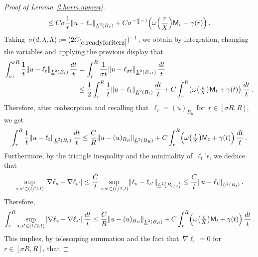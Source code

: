 \documentclass[11pt,twoside]{article} %
\numberwithin{equation}{section}
\theoremstyle{definition}
\let\originalleft\left
\let\originalright\right
\renewcommand{\left}{\mathopen{}\mathclose\bgroup\originalleft}
\renewcommand{\right}{\aftergroup\egroup\originalright}
\begin{document}
\begin{proof}[{Proof of Lemma~\ref{l.harm.approx}}]
\begin{equation}
\leq
C\sigma \frac 1r \left\| u- \ell_r \right\|_{\underline{L}^2 \left( B_{r} \right)} 
+
C\sigma^{-\frac d2 - 1} \left( \omega\Bigl( \frac{r}X \Bigr)  \mathsf{M}_r  + \gamma(r)\right)
\,.
\end{equation}
Taking~$\sigma(d,\lambda,\Lambda): = (2C_{\eqref{e.readyforiterz}})^{-1}$, we obtain by integration, changing the variables and applying the previous display that
\begin{align*} %
\int_{\sigma r}^{\sigma R} 
\frac1{t} \left\| u - \ell_{t} \right\|_{\underline{L}^2 \left( B_{ t} \right)} \, \frac{dt}{t}
& 
=
\int_{r}^{R} 
\frac1{\sigma t} \left\| u - \ell_{\sigma t} \right\|_{\underline{L}^2 \left( B_{\sigma t} \right)} \, \frac{dt}{t}
\notag \\ &
\leq 
\frac12
\int_{r}^{R} 
\frac1{t} \left\| u - \ell_{t} \right\|_{\underline{L}^2 \left( B_{ t} \right)} \, \frac{dt}{t}
+
C
\int_{r}^{R} 
\left(  \omega \bigl( \tfrac{t}X \bigr)  \mathsf{M}_t + \gamma(t)\right) \, \frac{dt}{t}\,.
\end{align*}
Therefore, after reabsorption and recalling that~$\ell_r = (u)_{B_R}$ for~$r \in [\sigma R,R]$, we get 
\begin{equation*}  
\int_{r}^{R} 
\frac1{t} \left\| u - \ell_{t} \right\|_{\underline{L}^2 \left( B_{ t} \right)} \, \frac{dt}{t}
\leq 
\frac CR \left\| u- (u)_{B_R} \right\|_{\underline{L}^2 \left( B_{R} \right)}   
+ C \int_{ r}^{R}  \Bigl( \omega\bigl( \tfrac{t}X \bigr)  \mathsf{M}_t  + \gamma(t) \Bigr) \, \frac{dt}{t} 
\,.
\end{equation*}
Furthermore, by the triangle inequality and the minimality of~$\ell_t$'s,  we deduce that 
\begin{equation*} %
\sup_{s,s' \in (t/2,t)} 
| \nabla \ell_s -  \nabla \ell_{s'}| 
\leq 
\frac{C}{t} \sup_{s,s' \in (t/2,t)} 
 \left\| \ell_s - \ell_{s'} \right\|_{\underline{L}^2 \left( B_{t/2} \right)}
 \leq 
 \frac{C}{t}  \left\| u - \ell_{t} \right\|_{\underline{L}^2 \left( B_{t} \right)}
 \,.
\end{equation*}
Therefore,
\begin{equation*} %
\int_{r}^{R} 
\sup_{s,s' \in (t/2,t)} 
| \nabla \ell_s -  \nabla \ell_{s'}| \, \frac{dt}{t}  
\leq \frac CR \left\| u- (u)_{B_R} \right\|_{\underline{L}^2 \left( B_{R} \right)}   
+ C \int_{ r}^{R}  \Bigl( \omega\bigl( \tfrac{t}X \bigr)  \mathsf{M}_t  + \gamma(t) \Bigr) \, \frac{dt}{t} 
\,.
\end{equation*}
This implies, by telescoping summation and the fact that~$\nabla \ell_r = 0$ for~$r \in [\sigma R,R]$, that

\end{proof}
\end{document}
